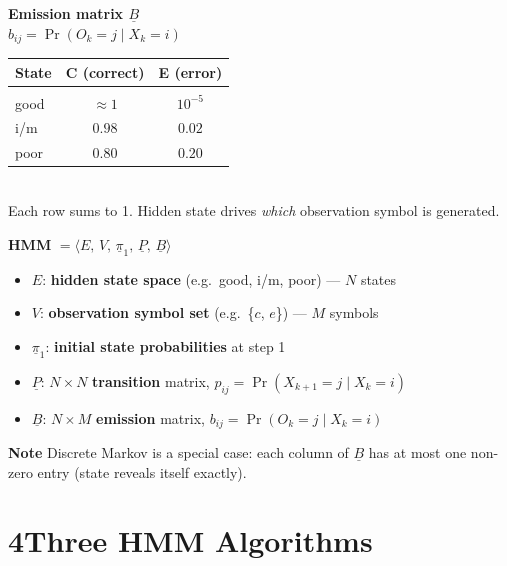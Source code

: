 \documentclass[10pt,a4paper]{article}
\begin{document}
\begin{minipage}[t]{0.43\textwidth}
\vspace{0pt}
\begin{notebox}
\textbf{Emission matrix $\underline{B}$}\\
$b_{ij}=\Pr(O_k{=}j\mid X_k{=}i)$\\[4pt]
\begin{tabular}{@{}l|cc@{}}
\textbf{State} & C (correct) & E (error)\\\hline\\[-6pt]
\textcolor{green!55!black}{good}  & $\approx 1$ & $10^{-5}$\\[2pt]
\textcolor{orange!80!black}{i/m}   & $0.98$ & $0.02$\\[2pt]
\textcolor{red!65!black}{poor}  & $0.80$ & $0.20$
\end{tabular}\\[4pt]
\small Each row sums to 1. Hidden state drives \emph{which} observation symbol is generated.
\end{notebox}
\end{minipage}

\begin{defbox}
\textbf{HMM} $= \langle E,\,V,\,\underline{\pi}_1,\,\underline{P},\,\underline{B}\rangle$\\[3pt]
\begin{itemize}
  \item $E$: \textbf{hidden state space} (e.g.\ good, i/m, poor) --- $N$ states
  \item $V$: \textbf{observation symbol set} (e.g.\ \{$c$, $e$\}) --- $M$ symbols
  \item $\underline{\pi}_1$: \textbf{initial state probabilities} at step 1
  \item $\underline{P}$: $N{\times}N$ \textbf{transition} matrix,\; $p_{ij} = \Pr(X_{k+1}{=}j \mid X_k{=}i)$
  \item $\underline{B}$: $N{\times}M$ \textbf{emission} matrix,\; $b_{ij} = \Pr(O_k{=}j \mid X_k{=}i)$
\end{itemize}
\end{defbox}
\begin{notebox}
\textbf{Note} Discrete Markov is a special case: each column of $\underline{B}$ has at most one non-zero entry (state reveals itself exactly).
\end{notebox}
\section*{4\quad Three HMM Algorithms}
\end{document}
